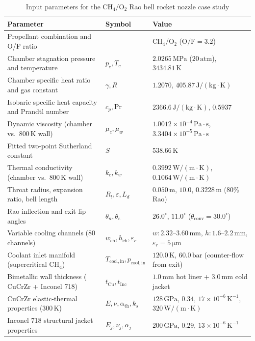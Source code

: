 \documentclass[11pt,a4paper]{article}
\begin{document}
\begin{table}[H]
\centering
\caption{Input parameters for the $\mathrm{CH_4/O_2}$ Rao bell rocket nozzle case study}
\vspace{0.2cm}
\small
\begin{tabular}{lll}
\toprule
\textbf{Parameter} & \textbf{Symbol} & \textbf{Value} \\
\midrule
Propellant combination and O/F ratio & -- & $\mathrm{CH_4 / O_2}$ ($\mathrm{O/F} = 3.2$) \\
Chamber stagnation pressure and temperature & $p_c, T_c$ & $2.0265\,\mathrm{MPa}$ ($20\,\mathrm{atm}$), $3434.81\,\mathrm{K}$ \\
Chamber specific heat ratio and gas constant & $\gamma, R$ & $1.2070$, $405.87\,\mathrm{J/(kg\cdot K)}$ \\
Isobaric specific heat capacity and Prandtl number & $c_p, \mathrm{Pr}$ & $2366.6\,\mathrm{J/(kg\cdot K)}$, $0.5937$ \\
Dynamic viscosity (chamber vs.\ $800\,\mathrm{K}$ wall) & $\mu_c, \mu_w$ & $1.0012\times 10^{-4}\,\mathrm{Pa\cdot s}$, $3.3404\times 10^{-5}\,\mathrm{Pa\cdot s}$ \\
Fitted two-point Sutherland constant & $S$ & $538.66\,\mathrm{K}$ \\
Thermal conductivity (chamber vs.\ $800\,\mathrm{K}$ wall) & $k_c, k_w$ & $0.3992\,\mathrm{W/(m\cdot K)}$, $0.1064\,\mathrm{W/(m\cdot K)}$ \\
Throat radius, expansion ratio, bell length & $R_t, \varepsilon, L_d$ & $0.050\,\mathrm{m}$, $10.0$, $0.3228\,\mathrm{m}$ (80\% Rao) \\
Rao inflection and exit lip angles & $\theta_n, \theta_e$ & $26.0^\circ$, $11.0^\circ$ ($\theta_{\mathrm{conv}} = 30.0^\circ$) \\
Variable cooling channels ($80$ channels) & $w_{\mathrm{ch}}, h_{\mathrm{ch}}, \varepsilon_r$ & $w: 2.32\text{--}3.60\,\mathrm{mm}$, $h: 1.6\text{--}2.2\,\mathrm{mm}$, $\varepsilon_r = 5\,\mathrm{\mu m}$ \\
Coolant inlet manifold (supercritical $\mathrm{CH_4}$) & $T_{\mathrm{cool,in}}, p_{\mathrm{cool,in}}$ & $120.0\,\mathrm{K}$, $60.0\,\mathrm{bar}$ (counter-flow from exit) \\
Bimetallic wall thickness ($\mathrm{CuCrZr}$ + Inconel 718) & $t_{\mathrm{Cu}}, t_{\mathrm{Inc}}$ & $1.0\,\mathrm{mm}$ hot liner + $3.0\,\mathrm{mm}$ cold jacket \\
$\mathrm{CuCrZr}$ elastic-thermal properties ($300\,\mathrm{K}$) & $E, \nu, \alpha_{\mathrm{th}}, k_s$ & $128\,\mathrm{GPa}$, $0.34$, $17\times 10^{-6}\,\mathrm{K^{-1}}$, $320\,\mathrm{W/(m\cdot K)}$ \\
Inconel 718 structural jacket properties & $E_j, \nu_j, \alpha_j$ & $200\,\mathrm{GPa}$, $0.29$, $13\times 10^{-6}\,\mathrm{K^{-1}}$ \\
\bottomrule
\end{tabular}
\end{table}
\end{document}
